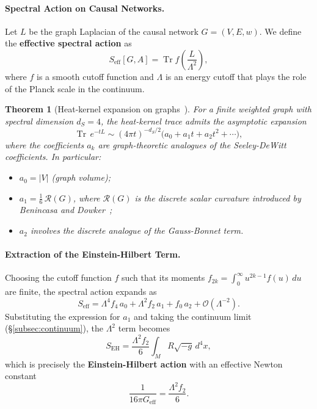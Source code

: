 \documentclass[11pt,a4paper]{article}
\newtheorem{theorem}{Theorem}[section]
\theoremstyle{definition}
\theoremstyle{remark}
\newcommand{\Geff}{G_{\text{eff}}}
\newcommand{\Seff}{S_{\text{eff}}}
\newcommand{\dS}{d_{S}}
\begin{document}
\paragraph{Spectral Action on Causal Networks.} Let $L$ be the graph Laplacian
of the causal network $G = (V, E, w)$. We define the \textbf{effective spectral
action} as
\begin{equation}\label{eq:Seff}
\Seff[G, A] = \operatorname{Tr} f\!\left(\frac{L}{\Lambda^{2}}\right),
\end{equation}
where $f$ is a smooth cutoff function and $\Lambda$ is an energy cutoff that
plays the role of the Planck scale in the continuum.

\begin{theorem}[Heat-kernel expansion on graphs~\cite{Chomiuk2026}]\label{thm:heat-kernel}
For a finite weighted graph with spectral dimension $\dS = 4$, the heat-kernel
trace admits the asymptotic expansion
\begin{equation}
\operatorname{Tr}\, e^{-t L} \sim (4\pi t)^{-\dS/2}
\bigl(a_{0} + a_{1} t + a_{2} t^{2} + \cdots\bigr),
\end{equation}
where the coefficients $a_{k}$ are graph-theoretic analogues of the
Seeley-DeWitt coefficients. In particular:
\begin{itemize}[noitemsep]
\item $a_{0} = |V|$ (graph volume);
\item $a_{1} = \frac{1}{6}\, \mathcal{R}(G)$, where $\mathcal{R}(G)$ is the
discrete scalar curvature introduced by Benincasa and
Dowker~\cite{Benincasa2010};
\item $a_{2}$ involves the discrete analogue of the Gauss-Bonnet term.
\end{itemize}
\end{theorem}

\paragraph{Extraction of the Einstein-Hilbert Term.} Choosing the cutoff
function $f$ such that its moments
$f_{2k} = \int_{0}^{\infty} u^{2k-1} f(u) \, du$ are finite, the spectral action
expands as~\cite{Connes1996}
\begin{equation}
\Seff = \Lambda^{4} f_{4} \, a_{0} + \Lambda^{2} f_{2} \, a_{1}
+ f_{0} \, a_{2} + \mathcal{O}(\Lambda^{-2}).
\end{equation}
Substituting the expression for $a_{1}$ and taking the continuum limit
(\S\ref{subsec:continuum}), the $\Lambda^{2}$ term becomes
\begin{equation}
S_{\text{EH}} = \frac{\Lambda^{2} f_{2}}{6} \int_{M} R \sqrt{-g} \, d^{4}x,
\end{equation}
which is precisely the \textbf{Einstein-Hilbert action} with an effective Newton
constant
\begin{equation}\label{eq:Geff}
\frac{1}{16\pi \Geff} = \frac{\Lambda^{2} f_{2}}{6}.
\end{equation}
\end{document}
